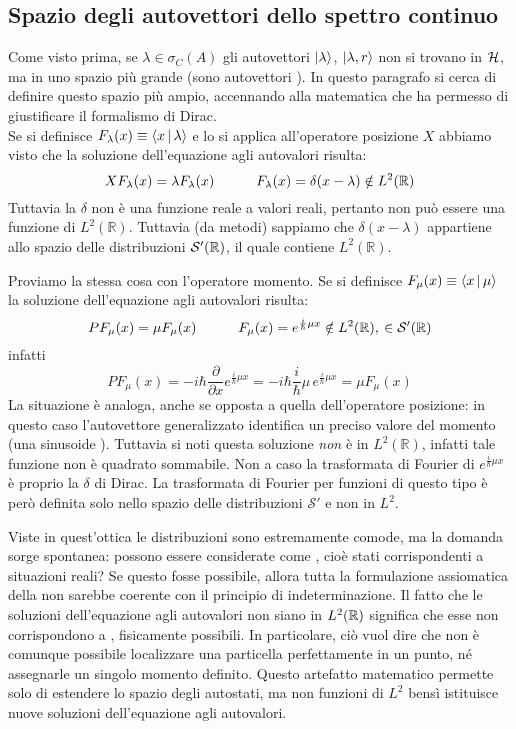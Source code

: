 \documentclass[../../FisicaTeorica.tex]{subfiles}
\begin{document}
\subsection{Spazio degli autovettori dello spettro continuo}
Come visto prima, se $\lambda \in \sigma_C(A)$ gli autovettori $\Ket{\lambda}$, $\Ket{\lambda,r}$ non si trovano in $\mathcal{H}$, ma in uno spazio più grande (sono autovettori ). In questo paragrafo si cerca di definire questo spazio più ampio, accennando alla matematica che ha permesso di giustificare il formalismo di Dirac.\\
Se si definisce  $F_\lambda(x) \equiv \Braket{x|\lambda}$ e lo si applica all'operatore posizione $X$ abbiamo visto che la soluzione dell'equazione agli autovalori risulta:
\[
XF_\lambda(x) = \lambda F_\lambda(x) \qquad \quad F_\lambda(x) = \delta(x-\lambda) \notin L^2(\mathbb{R})
\]
Tuttavia la $\delta$ non è una funzione reale a valori reali, pertanto non può essere una funzione di $L^2(\mathbb R)$. Tuttavia (da metodi) sappiamo che  $\delta(x-\lambda)$ appartiene allo spazio delle distribuzioni $\mathcal{S}'(\mathbb{R})$, il quale contiene $L^2(\mathbb R)$.

Proviamo la stessa cosa con l'operatore momento. Se si definisce $F_\mu(x) \equiv \Braket{x|\mu}$ la soluzione dell'equazione agli autovalori risulta:
\[
P F_\mu(x) = \mu F_\mu(x) \qquad \quad F_\mu(x) = e^{\frac{i}{\hbar}\mu x} \notin L^2(\mathbb{R}),\> \in \mathcal{S}'(\mathbb{R})
\] %
infatti
\[
P F_{\mu}(x) = - i \hbar \frac{\partial}{\partial x} e^{\frac{i}{\hbar} \mu x} = - i \hbar \frac{i}{\hbar} \mu \, e^{\frac{i}{\hbar} \mu x} = \mu F_{\mu}(x)
\]
La situazione è analoga, anche se opposta a quella dell'operatore posizione: in questo caso l'autovettore generalizzato identifica un preciso valore del momento (una sinusoide ). Tuttavia si noti questa soluzione \emph{non} è in $L^2(\mathbb R)$, infatti tale funzione non è quadrato sommabile. Non a caso la trasformata di Fourier di $e^{\frac{i}{\hbar}\mu x}$ è proprio la $\delta$ di Dirac. La trasformata di Fourier per funzioni di questo tipo è però definita solo nello spazio delle distribuzioni $\mathcal S'$ e non in $L^2$.

Viste in quest'ottica le distribuzioni sono estremamente comode, ma la domanda sorge spontanea: possono essere considerate come , cioè stati corrispondenti a situazioni reali? Se questo fosse possibile, allora tutta la formulazione assiomatica della \MQ non sarebbe coerente con il principio di indeterminazione. Il fatto che le soluzioni dell'equazione agli autovalori non siano in $L^2(\mathbb{R})$ significa che esse non corrispondono a , fisicamente possibili. In particolare, ciò vuol dire che non è comunque possibile localizzare una particella perfettamente in un punto, né assegnarle un singolo momento definito.
Questo artefatto matematico permette solo di estendere lo spazio degli autostati, ma non  funzioni di $L^2$ bensì istituisce nuove soluzioni  dell'equazione agli autovalori.
\end{document}
